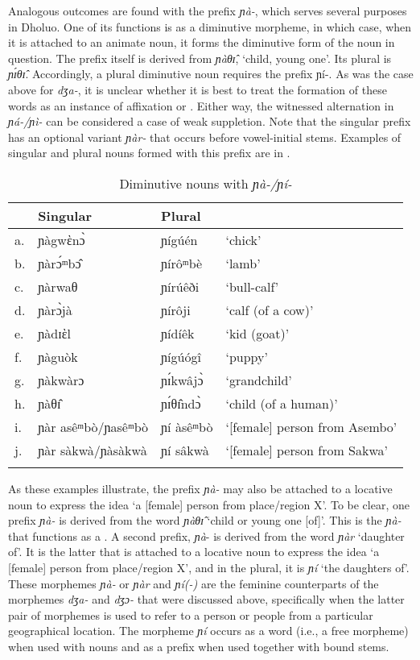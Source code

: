 \documentclass[output=paper,colorlinks,citecolor=brown]{langscibook}
\begin{document}
Analogous outcomes are found with the prefix \textit{ɲà-}, which serves several purposes in Dholuo. One of its functions is as a diminutive morpheme, in which case, when it is attached to an animate noun, it forms the diminutive form of the noun in question. The prefix itself is derived from \textit{ɲàθɪ̂}, `child, young one'. Its plural is \textit{ɲɪ́θɪ̂}. Accordingly, a plural diminutive noun requires the prefix {ɲí-}. As was the case above for \textit{dʒa-}, it is unclear whether it is best to treat the formation of these words as an instance of affixation or . Either way, the witnessed alternation in \textit{ɲá-/ɲì-} can be considered a case of weak suppletion. Note that the singular prefix has an optional variant \textit{ɲàr-} that occurs before vowel-initial stems. Examples of singular and plural nouns formed with this prefix are in .

\begin{table}
\caption{Diminutive nouns with \textit{ɲà-/ɲí-}}
\label{tab:DimNya}
 \begin{tabular}{llll}
  \lsptoprule
& Singular & Plural &  \\
\midrule
a.&	ɲàgwὲnɔ̀&	ɲígúén	&`chick'\\
b.&	ɲàrɔ́ᵐbɔ̂ &	ɲírôᵐbè	&`lamb'\\
c.&	ɲàrwaθ&	ɲírúêði	&`bull-calf'\\
d.&	ɲàrɔ̀jà&	ɲírôji	&`calf (of a cow)'\\
e.&	ɲàdɪὲl & 	ɲídíêk	&`kid (goat)'\\
f.&	ɲàguòk&	ɲígúógî&	`puppy'\\
g.&	ɲàkwàrɔ&	ɲɪ́kwâjɔ̀	&`grandchild'\\
h.&	ɲàθɪ̂&	ɲɪ́θɪ̂ndɔ̀	&`child (of a human)'\\
i.&	ɲàr asêᵐbò/ɲasêᵐbò &	ɲí àsêᵐbò	&`[female] person from Asembo'\\
j.&	ɲàr sàkwà/ɲàsàkwà	&ɲí sâkwà&	`[female] person from Sakwa'\\
  \lspbottomrule
 \end{tabular}
\end{table}   

As these examples illustrate, the prefix \textit{ɲà-} may also be attached to a locative noun to express the idea `a [female] person from place/region X'. To be clear, one prefix \textit{ɲà-} is derived from the word \textit{ɲàθɪ̂} `child or young one [of]'. This is the \textit{ɲà-} that functions as a . A second prefix, \textit{ɲà}- is derived from the word \textit{ɲàr} `daughter of'. It is the latter that is attached to a locative noun to express the idea `a [female] person from place/region X', and in the plural, it is \textit{ɲí} `the daughters of'. These morphemes \textit{ɲà-} or \textit{ɲàr} and \textit{ɲí(-)} are the feminine counterparts of the morphemes \textit{dʒa-} and \textit{dʒɔ-} that were discussed above, specifically when the latter pair of morphemes is used to refer to a person or people from a particular geographical location. The morpheme \textit{ɲí} occurs as a word (i.e., a free morpheme) when used with nouns and as a prefix when used together with bound stems. 
\end{document}
